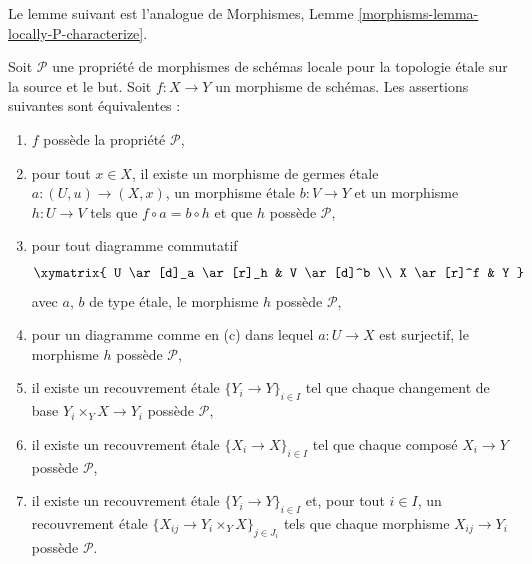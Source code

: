 \noindent
Le lemme suivant est l'analogue de
Morphismes, Lemme \ref{morphisms-lemma-locally-P-characterize}.

\begin{lemma}
\label{lemma-local-source-target-characterize}
Soit $\mathcal{P}$ une propriété de morphismes de schémas locale pour la
topologie \'etale sur la source et le but. Soit $f : X \to Y$ un morphisme de
schémas. Les assertions suivantes sont équivalentes :
\begin{enumerate}
\item[(a)] $f$ possède la propriété $\mathcal{P}$,
\item[(b)] pour tout $x \in X$, il existe un morphisme de germes \'etale
$a : (U, u) \to (X, x)$, un morphisme \'etale $b : V \to Y$ et un morphisme
$h : U \to V$ tels que $f \circ a = b \circ h$ et que $h$ possède
$\mathcal{P}$,
\item[(c)] pour tout diagramme commutatif
$$
\xymatrix{
U \ar[d]_a \ar[r]_h & V \ar[d]^b \\
X \ar[r]^f & Y
}
$$
avec $a$, $b$ de type \'etale, le morphisme $h$ possède $\mathcal{P}$,
\item[(d)] pour un diagramme comme en (c) dans lequel $a : U \to X$ est
surjectif, le morphisme $h$ possède $\mathcal{P}$,
\item[(e)] il existe un recouvrement \'etale $\{Y_i \to Y\}_{i \in I}$ tel
que chaque changement de base $Y_i \times_Y X \to Y_i$ possède
$\mathcal{P}$,
\item[(f)] il existe un recouvrement \'etale $\{X_i \to X\}_{i \in I}$ tel
que chaque composé $X_i \to Y$ possède $\mathcal{P}$,
\item[(g)] il existe un recouvrement \'etale $\{Y_i \to Y\}_{i \in I}$ et,
pour tout $i \in I$, un recouvrement \'etale
$\{X_{ij} \to Y_i \times_Y X\}_{j \in J_i}$ tels que chaque morphisme
$X_{ij} \to Y_i$ possède $\mathcal{P}$.
\end{enumerate}
\end{lemma}

